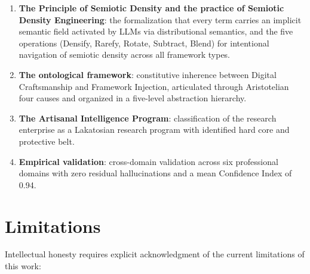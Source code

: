 \documentclass[12pt,a4paper]{article}
\begin{document}
\begin{enumerate}
  \item \textbf{The Principle of Semiotic Density and the practice of Semiotic Density Engineering}: the formalization that every term carries an implicit semantic field activated by LLMs via distributional semantics, and the five operations (Densify, Rarefy, Rotate, Subtract, Blend) for intentional navigation of semiotic density across all framework types.

  \item \textbf{The ontological framework}: constitutive inherence between Digital Craftsmanship and Framework Injection, articulated through Aristotelian four causes and organized in a five-level abstraction hierarchy.

  \item \textbf{The Artisanal Intelligence Program}: classification of the research enterprise as a Lakatosian research program with identified hard core and protective belt.

  \item \textbf{Empirical validation}: cross-domain validation across six professional domains with zero residual hallucinations and a mean Confidence Index of 0.94.
\end{enumerate}


\section{Limitations}
\label{sec:limitations}

Intellectual honesty requires explicit acknowledgment of the current limitations of this work:
\end{document}
